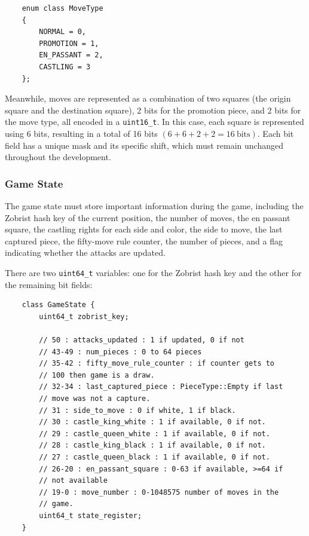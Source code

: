 \begin{lstlisting}
    enum class MoveType
    {
        NORMAL = 0,
        PROMOTION = 1,
        EN_PASSANT = 2,
        CASTLING = 3
    };
\end{lstlisting}

\noindent Meanwhile, moves are represented as a combination of two squares (the origin square and the destination square), 2 bits for the promotion piece, and 2 bits for the move type, all encoded in a \texttt{uint16\_t}. In this case, each square is represented using 6 bits, resulting in a total of 16 bits $(6 + 6 + 2 + 2 = 16~\mathrm{bits})$. Each bit field has a unique mask and its specific shift, which must remain unchanged throughout the development.

\subsubsection{Game State}

The game state must store important information during the game, including the Zobrist hash key of the current position, the number of moves, the en passant square, the castling rights for each side and color, the side to move, the last captured piece, the fifty-move rule counter, the number of pieces, and a flag indicating whether the attacks are updated.

\vspace{1em}

\noindent There are two \texttt{uint64\_t} variables: one for the Zobrist hash key and the other for the remaining bit fields:

\begin{lstlisting}
    class GameState {
        uint64_t zobrist_key;

        // 50 : attacks_updated : 1 if updated, 0 if not
        // 43-49 : num_pieces : 0 to 64 pieces
        // 35-42 : fifty_move_rule_counter : if counter gets to 
        // 100 then game is a draw.
        // 32-34 : last_captured_piece : PieceType::Empty if last
        // move was not a capture.
        // 31 : side_to_move : 0 if white, 1 if black.
        // 30 : castle_king_white : 1 if available, 0 if not.
        // 29 : castle_queen_white : 1 if available, 0 if not.
        // 28 : castle_king_black : 1 if available, 0 if not.
        // 27 : castle_queen_black : 1 if available, 0 if not.
        // 26-20 : en_passant_square : 0-63 if available, >=64 if
        // not available
        // 19-0 : move_number : 0-1048575 number of moves in the 
        // game.
        uint64_t state_register;
    }
\end{lstlisting}

